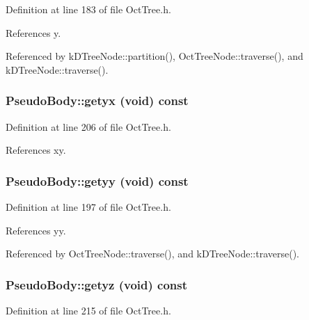 Definition at line 183 of file OctTree.h.



References y.



Referenced by kDTreeNode::partition(), OctTreeNode::traverse(), and kDTreeNode::traverse().

\subsubsection[{getyx}]{ PseudoBody::getyx (void) const}\label{classPseudoBody_ad0c2aecb408f80992212fc769df56c12}


Definition at line 206 of file OctTree.h.



References xy.

\subsubsection[{getyy}]{ PseudoBody::getyy (void) const}\label{classPseudoBody_a991d2e4368d7e218ebdb21bf3bfc9cc0}


Definition at line 197 of file OctTree.h.



References yy.



Referenced by OctTreeNode::traverse(), and kDTreeNode::traverse().

\subsubsection[{getyz}]{ PseudoBody::getyz (void) const}\label{classPseudoBody_ab846033eaaf6e53ea4a42bd1e75f0e46}


Definition at line 215 of file OctTree.h.



